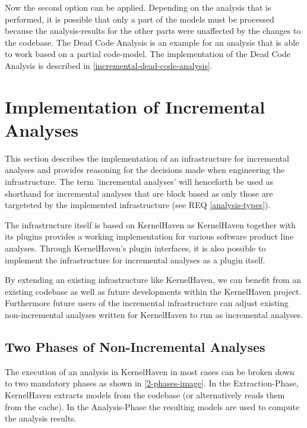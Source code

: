 \documentclass[a4paper]{article}
\begin{document}
Now the second option can be applied. Depending on the analysis that is performed, it is possible that only a part of the models must be processed because the analysis-results for the other parts were unaffected by the changes to the codebase. The Dead Code Analysis is an example for an analysis that is able to work based on a partial code-model. The implementation of the Dead Code Analysis is described in \autoref{incremental-dead-code-analysis}.


\clearpage


\section{Implementation of Incremental Analyses}\label{implementation}

This section describes the implementation of an infrastructure for incremental analyses and provides reasoning for the decisions made when engineering the infrastructure. The term 'incremental analyses' will henceforth be used as shorthand for incremental analyses that are block based as only those are targeteted by the implemented infrastructure (see REQ \ref{analysis-types}).

The infrastructure itself is based on KernelHaven\cite{KernelHaven} as KernelHaven together with its plugins provides a working implementation for various software product line analyses. Through KernelHaven's plugin interfaces, it is also possible to implement the infrastructure for incremental analyses as a plugin itself.

By extending an existing infrastructure like KernelHaven, we can benefit from an existing codebase as well as future developments within the KernelHaven project. Furthermore future users of the incremental infrastructure can adjust existing non-incremental analyses written for KernelHaven to run as incremental analyses.

\subsection{Two Phases of Non-Incremental Analyses}\label{2-phases}

The execution of an analysis in KernelHaven in most cases can be broken down to two mandatory phases as shown in \autoref{2-phases-image}. In the Extraction-Phase, KernelHaven extracts models from the codebase  (or alternatively reads them from the cache). In the Analysis-Phase the resulting models are used to compute the analysis results.
\end{document}
